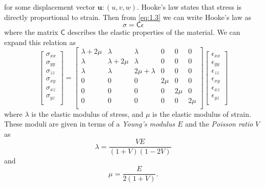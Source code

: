 \documentclass[twoside]{bsu-ms}
\begin{document}
for some displacement vector $\mathbf{u}:(u,v,w)$. Hooke's law states that stress is directly proportional to strain. Then from \eqref{eq:1.3} we can write Hooke's law as
\begin{equation}\label{eq:1.4}
    \mathbf{\mathsf{\sigma}}=\mathbf{\mathsf{C}}\mathbf{\mathsf{\epsilon}}
\end{equation}
where the matrix $\mathbf{\mathsf{C}}$ describes the elastic properties of the material.  We can expand this relation as 
\begin{equation}\label{eq:1.5}
	\begin{bmatrix}
		\sigma_{xx}\\
		\sigma_{yy}\\
		\sigma_{zz}\\
		\sigma_{xy}\\
		\sigma_{xz}\\
		\sigma_{yz}\\
	\end{bmatrix}=\begin{bmatrix}
	\lambda+2\mu&\lambda&\lambda&0&0&0\\
	\lambda&\lambda+2\mu&\lambda&0&0&0\\
	\lambda&\lambda&2\mu+\lambda&0&0&0\\
	0&0&0&2\mu&0&0\\
	0&0&0&0&2\mu&0\\
	0&0&0&0&0&2\mu\\
\end{bmatrix}
\begin{bmatrix}
		\epsilon_{xx}\\
		\epsilon_{yy}\\
		\epsilon_{zz}\\
		\epsilon_{xy}\\
		\epsilon_{xz}\\
		\epsilon_{yz}\\
\end{bmatrix}
\end{equation}
where $\lambda$ is the elastic modulus of stress, and $\mu$ is the elastic modulus of strain. These moduli are given in terms of a {\em Young's modulus $E$} and the {\em Poisson ratio} $V$ as
\begin{equation}\label{eq:1.6}
    \lambda=\frac{V E}{(1+V)(1-2V)}
\end{equation}
and
\begin{equation}\label{eq:1.7}
    \mu=\frac{E}{2(1+V)}.
\end{equation}
\end{document}
